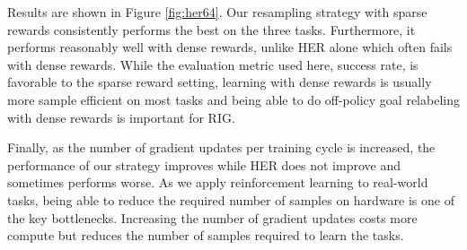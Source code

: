Results are shown in Figure \ref{fig:her64}. Our resampling strategy with sparse rewards consistently performs the best on the three tasks. Furthermore, it performs reasonably well with dense rewards, unlike HER alone which often fails with dense rewards. While the evaluation metric used here, success rate, is favorable to the sparse reward setting, learning with dense rewards is usually more sample efficient on most tasks and being able to do off-policy goal relabeling with dense rewards is important for RIG.

Finally, as the number of gradient updates per training cycle is increased, the performance of our strategy improves while HER does not improve and sometimes performs worse. As we apply reinforcement learning to real-world tasks, being able to reduce the required number of samples on hardware is one of the key bottlenecks. Increasing the number of gradient updates costs more compute but reduces the number of samples required to learn the tasks.

